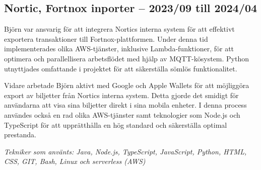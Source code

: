\subsection*{\textcolor{colorTitelErfarenhet}{Nortic, Fortnox inporter – 2023/09 till 2024/04}}
Björn var ansvarig för att integrera Nortics interna system för att effektivt exportera transaktioner till Fortnox-plattformen. 
Under denna tid implementerades olika AWS-tjänster, inklusive Lambda-funktioner, för att optimera och parallellisera arbetsflödet med hjälp av MQTT-kösystem. 
Python utnyttjades omfattande i projektet för att säkerställa sömlös funktionalitet.

Vidare arbetade Björn aktivt med Google och Apple Wallets för att möjliggöra export av biljetter från Nortics interna system. 
Detta gjorde det smidigt för användarna att visa sina biljetter direkt i sina mobila enheter. 
I denna process användes också en rad olika AWS-tjänster samt teknologier som Node.js och TypeScript för att upprätthålla en hög standard och säkerställa optimal prestanda.

\vspace{5pt}\textit{Tekniker som använts: Java, Node.js, TypeScript, JavaScript, Python, HTML, CSS, GIT, Bash, Linux och serverless (AWS)}

